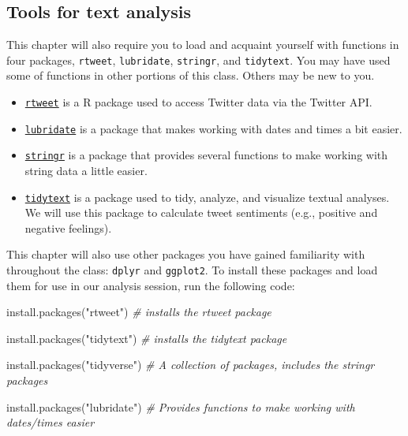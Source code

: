 \documentclass[
]{book}
\newenvironment{Shaded}{\begin{snugshade}}{\end{snugshade}}
\newcommand{\CommentTok}[1]{\textcolor[rgb]{0.56,0.35,0.01}{\textit{#1}}}
\newcommand{\FunctionTok}[1]{\textcolor[rgb]{0.00,0.00,0.00}{#1}}
\newcommand{\NormalTok}[1]{#1}
\newcommand{\StringTok}[1]{\textcolor[rgb]{0.31,0.60,0.02}{#1}}
\begin{document}
\hypertarget{tools-for-text-analysis}{%
\subsection{Tools for text analysis}\label{tools-for-text-analysis}}

This chapter will also require you to load and acquaint yourself with functions in four packages, \texttt{rtweet}, \texttt{lubridate}, \texttt{stringr}, and \texttt{tidytext}. You may have used some of functions in other portions of this class. Others may be new to you.

\begin{itemize}
\item
  \href{https://rtweet.info/index.html}{\texttt{rtweet}} is a R package used to access Twitter data via the Twitter API.
\item
  \href{https://lubridate.tidyverse.org/}{\texttt{lubridate}} is a package that makes working with dates and times a bit easier.
\item
  \href{https://stringr.tidyverse.org/}{\texttt{stringr}} is a package that provides several functions to make working with string data a little easier.
\item
  \href{https://juliasilge.github.io/tidytext/}{\texttt{tidytext}} is a package used to tidy, analyze, and visualize textual analyses. We will use this package to calculate tweet sentiments (e.g., positive and negative feelings).
\end{itemize}

This chapter will also use other packages you have gained familiarity with throughout the class: \texttt{dplyr} and \texttt{ggplot2}. To install these packages and load them for use in our analysis session, run the following code:

\begin{Shaded}
\begin{Highlighting}[]
\FunctionTok{install.packages}\NormalTok{(}\StringTok{"rtweet"}\NormalTok{) }\CommentTok{\# installs the rtweet package}

\FunctionTok{install.packages}\NormalTok{(}\StringTok{"tidytext"}\NormalTok{) }\CommentTok{\# installs the tidytext package}

\FunctionTok{install.packages}\NormalTok{(}\StringTok{"tidyverse"}\NormalTok{) }\CommentTok{\# A collection of packages, includes the stringr packages}

\FunctionTok{install.packages}\NormalTok{(}\StringTok{"lubridate"}\NormalTok{) }\CommentTok{\# Provides functions to make working with dates/times easier}
\end{Highlighting}
\end{Shaded}
\end{document}
